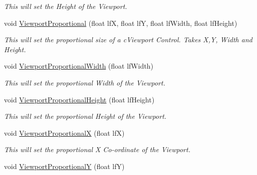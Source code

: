\begin{DoxyCompactItemize}
\begin{DoxyCompactList}\small\item\em This will set the Height of the Viewport. \end{DoxyCompactList}\item 
\hypertarget{classc_viewport_control_a1ded5812151e520acd7a59ee54c2da18}{
void \hyperlink{classc_viewport_control_a1ded5812151e520acd7a59ee54c2da18}{ViewportProportional} (float lfX, float lfY, float lfWidth, float lfHeight)}
\label{classc_viewport_control_a1ded5812151e520acd7a59ee54c2da18}

\begin{DoxyCompactList}\small\item\em This will set the proportional size of a cViewport Control. Takes X,Y, Width and Height. \end{DoxyCompactList}\item 
\hypertarget{classc_viewport_control_a737b80cd951fb7788515246e73c6efcb}{
void \hyperlink{classc_viewport_control_a737b80cd951fb7788515246e73c6efcb}{ViewportProportionalWidth} (float lfWidth)}
\label{classc_viewport_control_a737b80cd951fb7788515246e73c6efcb}

\begin{DoxyCompactList}\small\item\em This will set the proportional Width of the Viewport. \end{DoxyCompactList}\item 
\hypertarget{classc_viewport_control_a127824d41e7d79d9ac9f29fdd5ff9191}{
void \hyperlink{classc_viewport_control_a127824d41e7d79d9ac9f29fdd5ff9191}{ViewportProportionalHeight} (float lfHeight)}
\label{classc_viewport_control_a127824d41e7d79d9ac9f29fdd5ff9191}

\begin{DoxyCompactList}\small\item\em This will set the proportional Height of the Viewport. \end{DoxyCompactList}\item 
\hypertarget{classc_viewport_control_aebe75df4d8a302de7b74ec96021246bd}{
void \hyperlink{classc_viewport_control_aebe75df4d8a302de7b74ec96021246bd}{ViewportProportionalX} (float lfX)}
\label{classc_viewport_control_aebe75df4d8a302de7b74ec96021246bd}

\begin{DoxyCompactList}\small\item\em This will set the proportional X Co-\/ordinate of the Viewport. \end{DoxyCompactList}\item 
\hypertarget{classc_viewport_control_a6c375e235aaf3fb405311ec5871b8a36}{
void \hyperlink{classc_viewport_control_a6c375e235aaf3fb405311ec5871b8a36}{ViewportProportionalY} (float lfY)}
\label{classc_viewport_control_a6c375e235aaf3fb405311ec5871b8a36}


\end{DoxyCompactItemize}
